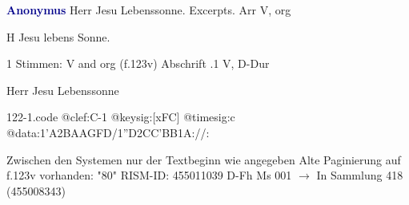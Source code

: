 \documentclass[twocolumn]{book}
\begin{document}
\newline \par \vspace{7pt} \textcolor{darkblue}{\textbf{Anonymus  }}
\newline Herr Jesu Lebenssonne. Excerpts. Arr
\newline V, org
\newline \begin{itshape} H Jesu lebens Sonne.\end{itshape} 
\newline \textcolor{darkblue}{}  1 Stimmen: V and org  (f.123v)
\newline Abschrift
.1  V, D-Dur
\newline \begin{footnotesize} Herr Jesu Lebenssonne \end{footnotesize}  
\begin{filecontents*}{122-1.code}
@clef:C-1
@keysig:[xFC]
@timesig:c
@data:1'A2BAAGFD/1''D2CC'BB1A://:
\end{filecontents*}
\newline
%
\newline Zwischen den Systemen nur der Textbeginn wie angegeben
\newline Alte Paginierung auf f.123v vorhanden: "80"
\newline RISM-ID: 455011039
\newline D-Fh  Ms 001
\newline $\rightarrow$ In Sammlung 418 (455008343)
      
\end{document}
